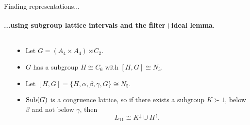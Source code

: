 \begin{frame}[label=knownresults,shrink=5]{Finding representations...}
  \framesubtitle{...using subgroup lattice intervals and the filter+ideal lemma.}

  \begin{columns}
    \begin{column}{0.2\textwidth}
      \begin{center}
      \end{center}
    \end{column}
    \begin{column}{0.6\textwidth}
      \vskip1cm
      \begin{itemize}
      \item<2-> 
        Let $G=(A_4 \times A_4) \rtimes C_2$. %
      \item<2-> $G$ has a subgroup $H \cong C_6$ with $[H, G] \cong N_5$. \hskip6pt %
      \item<2-> Let $[H, G] = \{H, \alpha, \beta, \gamma, G\} \cong N_5$.\vskip6pt
      \item<3-> $\mathrm{Sub}(G)$ is a congruence lattice, so
        if there exists a subgroup $K \succ 1$, below $\beta$ and not below $\gamma$, 
        then \[L_{11} \cong K^\downarrow \cup H^\uparrow.\]
      \end{itemize}
    \end{column}
  \end{columns}


\end{frame}
